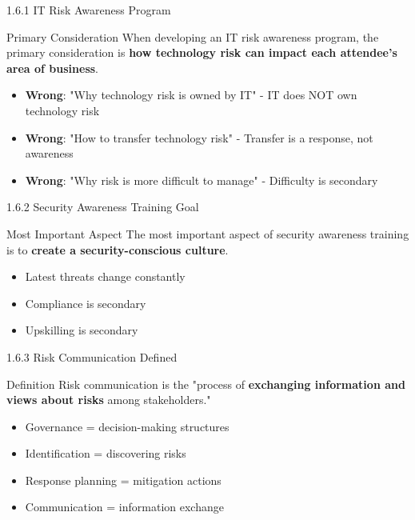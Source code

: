 \documentclass{beamer}
\begin{document}
	\begin{frame}{1.6.1 IT Risk Awareness Program}
		\begin{block}{Primary Consideration}
			When developing an IT risk awareness program, the primary consideration is \textbf{how technology risk can impact each attendee's area of business}.
		\end{block}
		\begin{itemize}
			\item \textbf{Wrong}: "Why technology risk is owned by IT" - IT does NOT own technology risk
			\item \textbf{Wrong}: "How to transfer technology risk" - Transfer is a response, not awareness
			\item \textbf{Wrong}: "Why risk is more difficult to manage" - Difficulty is secondary
		\end{itemize}
	\end{frame}
	
	\begin{frame}{1.6.2 Security Awareness Training Goal}
		\begin{block}{Most Important Aspect}
			The most important aspect of security awareness training is to \textbf{create a security-conscious culture}.
		\end{block}
		\begin{itemize}
			\item Latest threats change constantly
			\item Compliance is secondary
			\item Upskilling is secondary
		\end{itemize}
	\end{frame}
	
	\begin{frame}{1.6.3 Risk Communication Defined}
		\begin{block}{Definition}
			Risk communication is the "process of \textbf{exchanging information and views about risks} among stakeholders."
		\end{block}
		\begin{itemize}
			\item Governance = decision-making structures
			\item Identification = discovering risks
			\item Response planning = mitigation actions
			\item Communication = information exchange
		\end{itemize}
	\end{frame}
	
\end{document}
